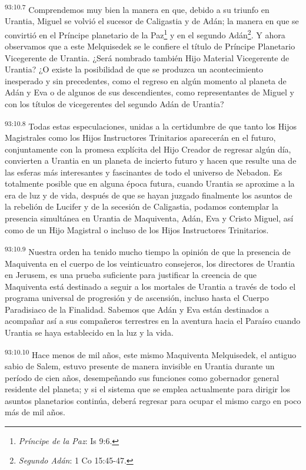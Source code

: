 \par
\textsuperscript{93:10.7} Comprendemos muy bien la manera en que, debido a su triunfo en Urantia, Miguel se volvió el sucesor de Caligastia y de Adán; la manera en que se convirtió en el Príncipe planetario de la Paz\footnote{\textit{Príncipe de la Paz}: Is 9:6.} y en el segundo Adán\footnote{\textit{Segundo Adán}: 1 Co 15:45-47.}. Y ahora observamos que a este Melquisedek se le confiere el título de Príncipe Planetario Vicegerente de Urantia. ¿Será nombrado también Hijo Material Vicegerente de Urantia? ¿O existe la posibilidad de que se produzca un acontecimiento inesperado y sin precedentes, como el regreso en algún momento al planeta de Adán y Eva o de algunos de sus descendientes, como representantes de Miguel y con los títulos de vicegerentes del segundo Adán de Urantia?

\par
\textsuperscript{93:10.8} Todas estas especulaciones, unidas a la certidumbre de que tanto los Hijos Magistrales como los Hijos Instructores Trinitarios aparecerán en el futuro, conjuntamente con la promesa explícita del Hijo Creador de regresar algún día, convierten a Urantia en un planeta de incierto futuro y hacen que resulte una de las esferas más interesantes y fascinantes de todo el universo de Nebadon. Es totalmente posible que en alguna época futura, cuando Urantia se aproxime a la era de luz y de vida, después de que se hayan juzgado finalmente los asuntos de la rebelión de Lucifer y de la secesión de Caligastia, podamos contemplar la presencia simultánea en Urantia de Maquiventa, Adán, Eva y Cristo Miguel, así como de un Hijo Magistral o incluso de los Hijos Instructores Trinitarios.

\par
\textsuperscript{93:10.9} Nuestra orden ha tenido mucho tiempo la opinión de que la presencia de Maquiventa en el cuerpo de los veinticuatro consejeros, los directores de Urantia en Jerusem, es una prueba suficiente para justificar la creencia de que Maquiventa está destinado a seguir a los mortales de Urantia a través de todo el programa universal de progresión y de ascensión, incluso hasta el Cuerpo Paradisiaco de la Finalidad. Sabemos que Adán y Eva están destinados a acompañar así a sus compañeros terrestres en la aventura hacia el Paraíso cuando Urantia se haya establecido en la luz y la vida.

\par
\textsuperscript{93:10.10} Hace menos de mil años, este mismo Maquiventa Melquisedek, el antiguo sabio de Salem, estuvo presente de manera invisible en Urantia durante un período de cien años, desempeñando sus funciones como gobernador general residente del planeta; y si el sistema que se emplea actualmente para dirigir los asuntos planetarios continúa, deberá regresar para ocupar el mismo cargo en poco más de mil años.


